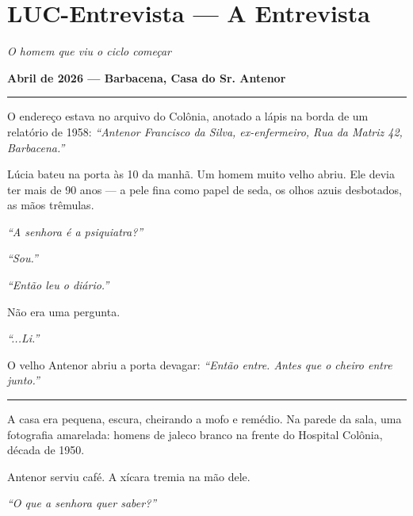 \section*{\textbf{LUC-Entrevista} --- A Entrevista}

\noindent \textit{O homem que viu o ciclo começar}

\noindent \textbf{Abril de 2026 --- Barbacena, Casa do Sr. Antenor}

\vspace{0.5em}\noindent\rule{\textwidth}{0.5pt}\vspace{0.5em}

\noindent O endereço estava no arquivo do Colônia, anotado a lápis na borda de um relatório de 1958: \textit{\textquotedblleft{}Antenor Francisco da Silva, ex-enfermeiro, Rua da Matriz 42, Barbacena.\textquotedblright{}}

\noindent Lúcia bateu na porta às 10 da manhã. Um homem muito velho abriu. Ele devia ter mais de 90 anos --- a pele fina como papel de seda, os olhos azuis desbotados, as mãos trêmulas.

\noindent \textit{\textquotedblleft{}A senhora é a psiquiatra?\textquotedblright{}}

\noindent \textit{\textquotedblleft{}Sou.\textquotedblright{}}

\noindent \textit{\textquotedblleft{}Então leu o diário.\textquotedblright{}}

\noindent Não era uma pergunta.

\noindent \textit{\textquotedblleft{}...Li.\textquotedblright{}}

\noindent O velho Antenor abriu a porta devagar: \textit{\textquotedblleft{}Então entre. Antes que o cheiro entre junto.\textquotedblright{}}

\vspace{0.5em}\noindent\rule{\textwidth}{0.5pt}\vspace{0.5em}

\noindent A casa era pequena, escura, cheirando a mofo e remédio. Na parede da sala, uma fotografia amarelada: homens de jaleco branco na frente do Hospital Colônia, década de 1950.

\noindent Antenor serviu café. A xícara tremia na mão dele.

\noindent \textit{\textquotedblleft{}O que a senhora quer saber?\textquotedblright{}}

